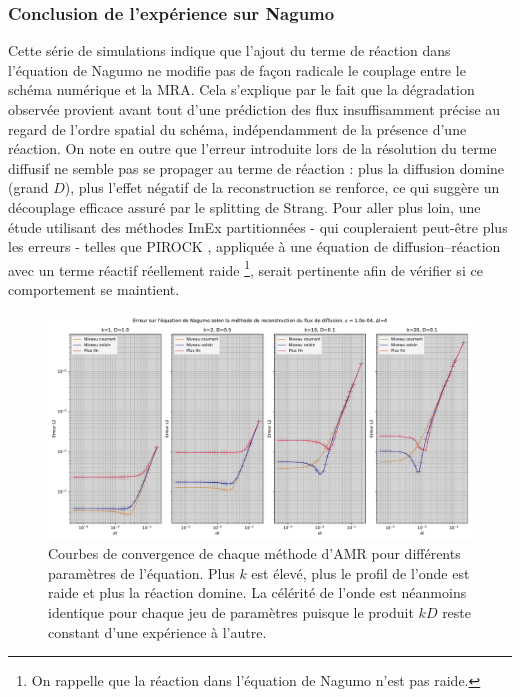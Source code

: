 \subsubsection{Conclusion de l'expérience sur Nagumo}
Cette série de simulations indique que l'ajout du terme de réaction dans l'équation de Nagumo ne modifie pas de façon radicale le couplage entre le schéma numérique et la MRA. 
Cela s'explique par le fait que la dégradation observée provient avant tout d'une prédiction des flux insuffisamment précise au regard de l'ordre spatial du schéma, 
indépendamment de la présence d'une réaction.
On note en outre que l'erreur introduite lors de la résolution du terme diffusif ne semble pas se propager au terme de réaction :
plus la diffusion domine (grand $D$), plus l'effet négatif de la reconstruction se renforce, ce qui suggère un découplage efficace assuré par le splitting de Strang.
Pour aller plus loin, une étude utilisant des méthodes ImEx partitionnées - qui coupleraient peut-être plus les erreurs - telles que PIROCK \cite{Abdulle2013}, appliquée à une équation de diffusion–réaction avec un terme réactif réellement raide
\footnote{On rappelle que la réaction dans l'équation de Nagumo n'est pas raide.}, serait pertinente afin de vérifier si ce comportement se maintient.
\begin{figure}[h!]
    \centering
    \includegraphics[width=\textwidth]{media/4_travail/3/flux_reconstruction_method_nagumo.pdf}
    \caption{Courbes de convergence de chaque méthode d'AMR pour différents paramètres de l'équation. Plus $k$ est élevé, plus le profil de l'onde est raide et plus la réaction domine. La célérité de l'onde est néanmoins identique pour chaque jeu de paramètres puisque le produit $kD$ reste constant d'une expérience à l'autre.}
    \label{fig:flux_reconstruction_nagumo}
\end{figure}